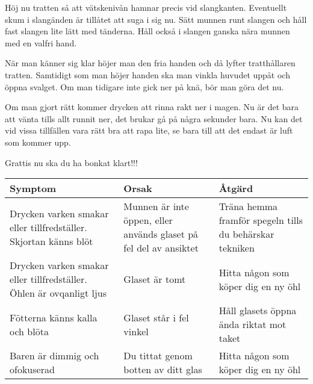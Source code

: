 Höj nu tratten så att vätskenivån hamnar precis vid slangkanten. Eventuellt skum i slangänden är tillåtet att suga i sig nu. Sätt munnen runt slangen och håll fast slangen lite lätt med tänderna. Håll också i slangen ganska nära munnen med en valfri hand.

När man känner sig klar höjer man den fria handen och då lyfter tratthållaren tratten. Samtidigt som man höjer handen ska man vinkla huvudet uppåt och öppna svalget. Om man tidigare inte gick ner på knä, bör man göra det nu.

Om man gjort rätt kommer drycken att rinna rakt ner i magen. Nu är det bara att vänta tills allt runnit ner, det brukar gå på några sekunder bara. Nu kan det vid vissa tillfällen vara rätt bra att rapa lite, se bara till att det endast är luft som kommer upp.

Grattis nu ska du ha bonkat klart!!!\newpage


\begin{adjustbox}{angle=-90}
  \begin{tabular}{|p{0.3\textheight}|p{0.3\textheight}|p{0.3\textheight}|}
    \hline
    \textbf{Symptom} & \textbf{Orsak} & \textbf{Åtgärd} \\
    \hline
    Drycken varken smakar eller tillfredställer. Skjortan känns blöt & 
    Munnen är inte öppen, eller används glaset på fel del av ansiktet & 
    Träna hemma framför spegeln tills du behärskar tekniken \\
    \hline
    Drycken varken smakar eller tillfredställer. Öhlen är ovqanligt ljus &
    Glaset är tomt &
    Hitta någon som köper dig en ny öhl \\
    \hline
    Fötterna känns kalla och blöta &
    Glaset står i fel vinkel &
    Håll glasets öppna ända riktat mot taket \\
    \hline
    Baren är dimmig och ofokuserad &
    Du tittat genom botten av ditt glas &
    Hitta någon som köper dig en ny öhl \\
    \hline
    
  \end{tabular}
\end{adjustbox}

